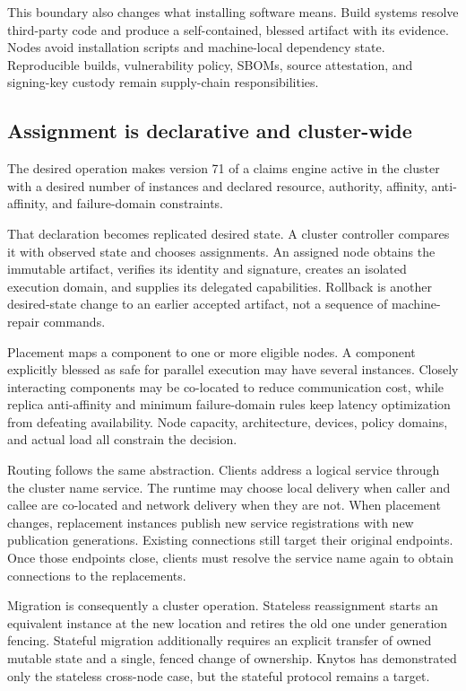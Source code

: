 This boundary also changes what installing software means. Build systems
resolve third-party code and produce a self-contained, blessed artifact with
its evidence. Nodes avoid installation scripts and machine-local dependency
state. Reproducible builds, vulnerability policy, SBOMs, source attestation,
and signing-key custody remain supply-chain responsibilities.

\subsection{Assignment is declarative and cluster-wide}

The desired operation makes version 71 of a claims engine active in the cluster with a
desired number of instances and declared resource, authority, affinity,
anti-affinity, and failure-domain constraints.

That declaration becomes replicated desired state. A cluster controller
compares it with observed state and chooses assignments. An assigned node
obtains the immutable artifact, verifies its identity and signature, creates
an isolated execution domain, and supplies its delegated capabilities.
Rollback is another desired-state change to an earlier accepted artifact,
not a sequence of machine-repair commands.

Placement maps a component to one or more eligible nodes. A component explicitly
blessed as safe for parallel execution may have several instances. Closely
interacting components may be co-located to reduce communication cost, while
replica anti-affinity and minimum failure-domain rules keep latency
optimization from defeating availability. Node capacity, architecture,
devices, policy domains, and actual load all constrain the decision.

Routing follows the same abstraction. Clients address a logical service
through the cluster name service. The runtime may choose local delivery when
caller and callee are co-located and network delivery when they are not. When
placement changes, replacement instances publish new service registrations
with new publication generations. Existing connections still target their original
endpoints. Once those endpoints close, clients must resolve the service name
again to obtain connections to the replacements.

Migration is consequently a cluster operation. Stateless reassignment starts an equivalent instance at
the new location and retires the old one under generation fencing. Stateful
migration additionally requires an explicit transfer of owned mutable state
and a single, fenced change of ownership. Knytos has demonstrated only
the stateless cross-node case, but the stateful protocol remains a target.

